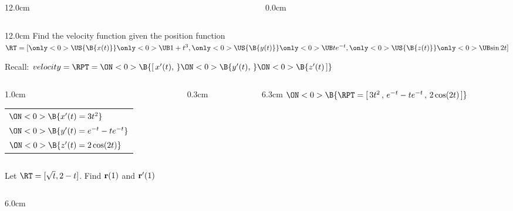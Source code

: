 \begin{frame}
\begin{columns}
\begin{column}{12.0cm}
	\vspace{3.9cm}
	
\end{column}
\begin{column}{0.0cm}\end{column}
\end{columns}
\end{frame}

\begin{frame}
{}
\scriptsize
\begin{columns}
\begin{column}{12.0cm}
\EX Find the velocity function given the position function \quad $\RT = [
\only<0>{\US{\B{ x(t) }}}{
\only<0>{\UB}{ 1+t^3 }}, 
\only<0>{\US{\B{ y(t) }}}{
\only<0>{\UB}{ te^{-t} }}, 
\only<0>{\US{\B{ z(t) }}}{
\only<0>{\UB}{ \sin2t }}]$

\vspace{0.2cm}

Recall: $velocity = \RPT = 
\ON<0>{\B{[ \,x'(t),\,}}
\ON<0>{\B{y'(t),\,}}
\ON<0>{\B{z'(t)\,]}}$
\vspace{0.6cm}

\vspace{0.2cm}
	
	\begin{columns}
	\begin{column}{1.0cm}
		\begin{tabular}{l}
			$\ON<0>{\B{x'(t) = 3t^2}}$ \\
			$\ON<0>{\B{y'(t) = e^{-t} - te^{-t}}}$ \\
			$\ON<0>{\B{z'(t) = 2\cos(2t)}}$
		\end{tabular}
	\end{column}
	\begin{column}{0.3cm}
		\ON<0>{\B{$\D{\implies}$}}
	\end{column}
	\begin{column}{6.3cm}
		$ 
		\ON<0>{\B{\RPT = [\,3t^2\,,\,e^{-t} - te^{-t}\,,\,2\cos(2t)\,]}}$
	\end{column}
	\end{columns}
	
	\vspace{1.0cm}
	
\EX Let $\RT = [\sqrt{t}, 2-t]$.  \quad Find ${\bf r}(1)$ and ${\bf r}'(1)$

\vspace{0.2cm}

\begin{columns}
\begin{column}{6.0cm}
	

\end{column}
\end{columns}
\end{column}
\end{columns}
\end{frame}
